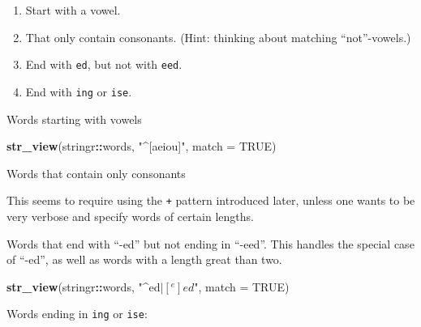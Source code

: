 \documentclass[]{book}
\newenvironment{Shaded}{\begin{snugshade}}{\end{snugshade}}
\newcommand{\DataTypeTok}[1]{\textcolor[rgb]{0.13,0.29,0.53}{#1}}
\newcommand{\KeywordTok}[1]{\textcolor[rgb]{0.13,0.29,0.53}{\textbf{#1}}}
\newcommand{\NormalTok}[1]{#1}
\newcommand{\OperatorTok}[1]{\textcolor[rgb]{0.81,0.36,0.00}{\textbf{#1}}}
\newcommand{\OtherTok}[1]{\textcolor[rgb]{0.56,0.35,0.01}{#1}}
\newcommand{\StringTok}[1]{\textcolor[rgb]{0.31,0.60,0.02}{#1}}
\providecommand{\tightlist}{%
  \setlength{\itemsep}{0pt}\setlength{\parskip}{0pt}}
\theoremstyle{plain}
\theoremstyle{remark}
\theoremstyle{definition}
\theoremstyle{definition}
\theoremstyle{definition}
\theoremstyle{remark}
\begin{document}
\begin{enumerate}
\def\labelenumi{\arabic{enumi}.}
\tightlist
\item
  Start with a vowel.
\item
  That only contain consonants. (Hint: thinking about matching
  ``not''-vowels.)
\item
  End with \texttt{ed}, but not with \texttt{eed}.
\item
  End with \texttt{ing} or \texttt{ise}.
\end{enumerate}

Words starting with vowels

\begin{Shaded}
\begin{Highlighting}[]
\KeywordTok{str_view}\NormalTok{(stringr}\OperatorTok{::}\NormalTok{words, }\StringTok{"^[aeiou]"}\NormalTok{, }\DataTypeTok{match =} \OtherTok{TRUE}\NormalTok{)}
\end{Highlighting}
\end{Shaded}

Words that contain only consonants

\begin{Shaded}
\end{Shaded}

This seems to require using the \texttt{+} pattern introduced later,
unless one wants to be very verbose and specify words of certain
lengths.

Words that end with ``-ed'' but not ending in ``-eed''. This handles the
special case of ``-ed'', as well as words with a length great than two.

\begin{Shaded}
\begin{Highlighting}[]
\KeywordTok{str_view}\NormalTok{(stringr}\OperatorTok{::}\NormalTok{words, }\StringTok{"^ed$|[^e]ed$"}\NormalTok{, }\DataTypeTok{match =} \OtherTok{TRUE}\NormalTok{)}
\end{Highlighting}
\end{Shaded}

Words ending in \texttt{ing} or \texttt{ise}:

\begin{Shaded}
\end{Shaded}
\end{document}
